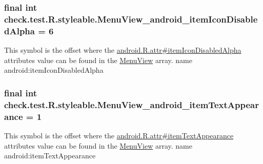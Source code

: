 \subsubsection[{Menu\+View\+\_\+android\+\_\+item\+Icon\+Disabled\+Alpha}]{\setlength{\rightskip}{0pt plus 5cm}final int check.\+test.\+R.\+styleable.\+Menu\+View\+\_\+android\+\_\+item\+Icon\+Disabled\+Alpha = 6\hspace{0.3cm}{\ttfamily [static]}}\label{classcheck_1_1test_1_1_r_1_1styleable_ac4582a310c88c18ea4a50f11ff473f68}
This symbol is the offset where the \hyperlink{}{android.\+R.\+attr\#item\+Icon\+Disabled\+Alpha} attribute\textquotesingle{}s value can be found in the \hyperlink{classcheck_1_1test_1_1_r_1_1styleable_acb1b5275ffcfc132a3221b157fed1ff8}{Menu\+View} array.  name android\+:item\+Icon\+Disabled\+Alpha \hypertarget{classcheck_1_1test_1_1_r_1_1styleable_ad1f162a33f4a61b0900eb474fd824ddb}{}
\subsubsection[{Menu\+View\+\_\+android\+\_\+item\+Text\+Appearance}]{\setlength{\rightskip}{0pt plus 5cm}final int check.\+test.\+R.\+styleable.\+Menu\+View\+\_\+android\+\_\+item\+Text\+Appearance = 1\hspace{0.3cm}{\ttfamily [static]}}\label{classcheck_1_1test_1_1_r_1_1styleable_ad1f162a33f4a61b0900eb474fd824ddb}
This symbol is the offset where the \hyperlink{}{android.\+R.\+attr\#item\+Text\+Appearance} attribute\textquotesingle{}s value can be found in the \hyperlink{classcheck_1_1test_1_1_r_1_1styleable_acb1b5275ffcfc132a3221b157fed1ff8}{Menu\+View} array.  name android\+:item\+Text\+Appearance \hypertarget{classcheck_1_1test_1_1_r_1_1styleable_a32c0f0f19e2ec8e866a3c03c63f95680}{}
